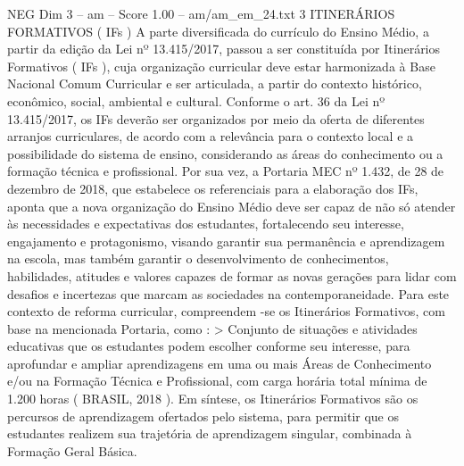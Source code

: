 \begin{textsample}{NEG Dim 3 – am – Score 1.00 – am/am\_em\_24.txt}  \label{ex:f3_neg_256}
3 ITINERÁRIOS FORMATIVOS ( IFs ) A parte diversificada do currículo do Ensino Médio, a partir da edição da Lei nº 13.415/2017, passou a ser constituída por Itinerários Formativos ( IFs ), cuja organização curricular deve estar harmonizada à Base Nacional Comum Curricular e ser articulada, a partir do contexto histórico, econômico, social, ambiental e cultural.
Conforme o art. 36 da Lei nº 13.415/2017, os IFs deverão ser organizados por meio da oferta de diferentes arranjos curriculares, de acordo com a relevância para o contexto local e a possibilidade do sistema de ensino, considerando as áreas do conhecimento ou a formação técnica e profissional.
Por sua vez, a Portaria MEC nº 1.432, de 28 de dezembro de 2018, que estabelece os referenciais para a elaboração dos IFs, aponta que a nova organização do Ensino Médio deve ser capaz de não só atender às necessidades e expectativas dos estudantes, fortalecendo seu interesse, engajamento e protagonismo, visando garantir sua permanência e aprendizagem na escola, mas também garantir o desenvolvimento de conhecimentos, habilidades, atitudes e valores capazes de formar as novas gerações para lidar com desafios e incertezas que marcam as sociedades na contemporaneidade.
Para este contexto de reforma curricular, compreendem -se os Itinerários Formativos, com base na mencionada Portaria, como : > Conjunto de situações e atividades educativas que os estudantes podem escolher conforme seu interesse, para aprofundar e ampliar aprendizagens em uma ou mais Áreas de Conhecimento e/ou na Formação Técnica e Profissional, com carga horária total mínima de 1.200 horas ( BRASIL, 2018 ).
Em síntese, os Itinerários Formativos são os percursos de aprendizagem ofertados pelo sistema, para permitir que os estudantes realizem sua trajetória de aprendizagem singular, combinada à Formação Geral Básica.

\end{textsample}
